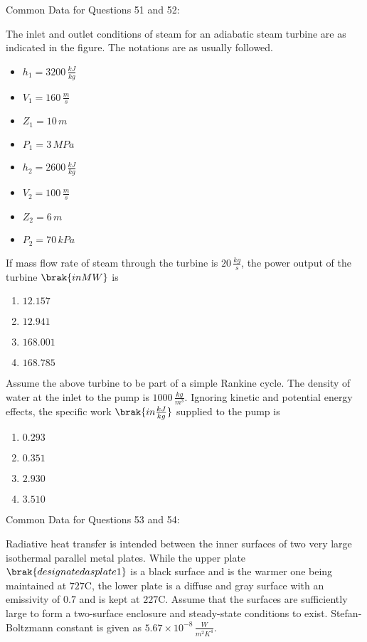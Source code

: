    Common Data for Questions 51 and 52:
    
    The inlet and outlet conditions of steam for an adiabatic steam turbine are as indicated in the figure. The notations are as usually followed.
    
    \begin{itemize}
        \item $h_1 = 3200 \, \frac{kJ}{kg}$
        \item $V_1 = 160 \, \frac{m}{s}$
        \item $Z_1 = 10 \, m$
        \item $P_1 = 3 \, MPa$
        \item $h_2 = 2600 \, \frac{kJ}{kg}$
        \item $V_2 = 100 \, \frac{m}{s}$
        \item $Z_2 = 6 \, m$
        \item $P_2 = 70 \, kPa$
    \end{itemize}

    \item If mass flow rate of steam through the turbine is $20 \, \frac{kg}{s}$, the power output of the turbine $\brak{in 
 MW}$ is
    \begin{enumerate}
        \item $12.157$
        \item $12.941$
        \item $168.001$
        \item $168.785$
    \end{enumerate}

    \item Assume the above turbine to be part of a simple Rankine cycle. The density of water at the inlet to the pump is $1000 \, \frac{kg}{m^3}$. Ignoring kinetic and potential energy effects, the specific work $\brak{in \frac{kJ}{kg}}$ supplied to the pump is
    \begin{enumerate}
        \item $0.293$
        \item $0.351$
        \item $2.930$
        \item $3.510$
    \end{enumerate}

   Common Data for Questions 53 and 54:
    
    Radiative heat transfer is intended between the inner surfaces of two very large isothermal parallel metal plates. While the upper plate $\brak{designated as plate 1}$ is a black surface and is the warmer one being maintained at $727 $\degree C, the lower plate  is a diffuse and gray surface with an emissivity of $0.7$ and is kept at $227 $\degree C. Assume that the surfaces are sufficiently large to form a two-surface enclosure and steady-state conditions to exist. Stefan-Boltzmann constant is given as $5.67 \times 10^{-8} \, \frac{W}{{m}^2{K}^4}$.

